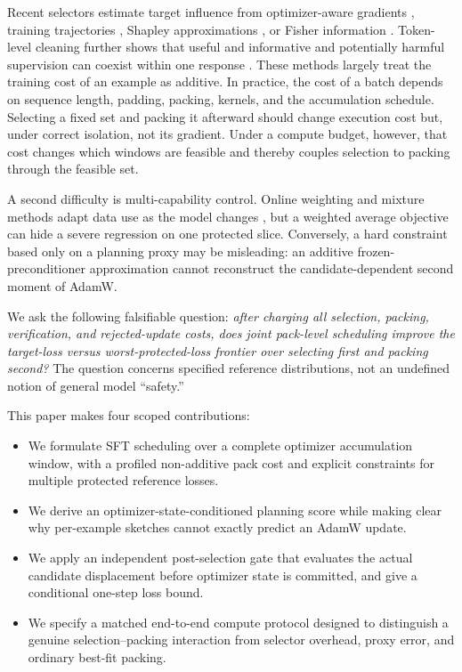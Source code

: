 \documentclass{article}
\begin{document}
Recent selectors estimate target influence from optimizer-aware gradients
\cite{xia2024less}, training trajectories \cite{yang2024smalltolarge}, Shapley
approximations \cite{he2024shed}, or Fisher information
\cite{deb2025fishersft}. Token-level cleaning further shows that useful and
informative and potentially harmful supervision can coexist within one response
\cite{pang2025tokencleaning}. These methods largely treat the training cost of
an example as additive. In practice, the cost of a batch depends on sequence
length, padding, packing, kernels, and the accumulation schedule. Selecting a
fixed set and packing it afterward should change execution cost but, under
correct isolation, not its gradient. Under a compute budget, however, that
cost changes which windows are feasible and thereby couples selection to
packing through the feasible set.

A second difficulty is multi-capability control. Online weighting and mixture
methods adapt data use as the model changes
\cite{yu2025dynamicbilevel,tan2026fastmix,ming2026ideal,zhao2026adapt}, but a
weighted average objective can hide a severe regression on one protected
slice. Conversely, a hard constraint based only on a planning proxy may be
misleading: an additive frozen-preconditioner approximation cannot reconstruct
the candidate-dependent second moment of AdamW.

We ask the following falsifiable question:
\emph{after charging all selection, packing, verification, and rejected-update
costs, does joint pack-level scheduling improve the target-loss versus
worst-protected-loss frontier over selecting first and packing second?}
The question concerns specified reference distributions, not an undefined
notion of general model ``safety.''

This paper makes four scoped contributions:
\begin{itemize}
  \item We formulate SFT scheduling over a complete optimizer accumulation
  window, with a profiled non-additive pack cost and explicit constraints for
  multiple protected reference losses.
  \item We derive an optimizer-state-conditioned planning score while making
  clear why per-example sketches cannot exactly predict an AdamW update.
  \item We apply an independent post-selection gate that evaluates the
  actual candidate displacement before optimizer state is committed, and give
  a conditional one-step loss bound.
  \item We specify a matched end-to-end compute protocol designed to distinguish
  a genuine selection--packing interaction from selector overhead, proxy error,
  and ordinary best-fit packing.
\end{itemize}
\end{document}
